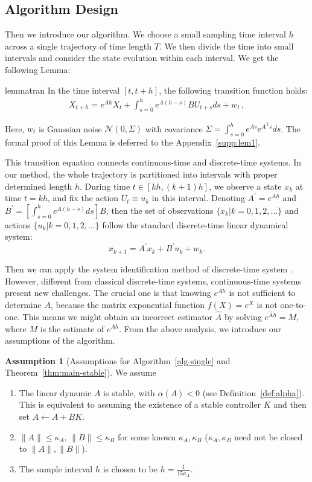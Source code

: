 \documentclass{article}
\theoremstyle{definition}
\newtheorem{assumption}{Assumption}
\begin{document}
\subsection{Algorithm 
Design}\label{section:alg for system id}
Then we introduce our algorithm. We choose a small sampling time interval $h$ across a single trajectory of time length $T$. We then divide the time into small intervals and consider the state evolution within each interval. We get the following Lemma:

\begin{restatable}{lemma}{tran}
\label{lem:tran}
   In the time interval $[t, t+h]$, the following transition function holds:
\begin{align*}
X_{t+h} = e^{Ah}X_{t}+\int_{s=0}^{h}e^{A(h-s)}BU_{t+s}ds+ w_t \,,
\end{align*}
\end{restatable}

Here, $w_{t}$ is Gaussian noise $\mathcal{N}(0, \Sigma)$ with covariance $\Sigma = \int_{s=0}^{h}e^{As}e^{A^{\mathrm{T}}s}ds$. The formal proof of this Lemma is deferred to the Appendix~\ref{supp:lem1}.

This transition equation connects continuous-time and discrete-time systems. In our method, the whole trajectory is partitioned into intervals with proper determined length $h$. During time $t\in[kh,(k+1)h]$, we observe a state $x_{k}$ at time $t=kh$, and fix the action $U_{t}\equiv u_{k}$ in this interval. Denoting $A^{'}=e^{Ah}$ and $B^{'}=\left[\int_{s=0}^{h}e^{A(h-s)}ds\right] B$, then the set of observations $\{x_{k} \vert k=0,1,2,...  \}$ and actions $\{u_{k} \vert k=0,1,2,...  \}$ follow the standard discrete-time linear dynamical system:
$$ x_{k+1}=A^{'}x_{k}+B^{'}u_{k}+w_{k}.$$

Then we can apply the system identification method of discrete-time system~\cite{ref4, ref5}. However, different from classical discrete-time systems, continuous-time systems present new challenges. The crucial one is that knowing $e^{Ah}$ is not sufficient to determine $A$, because the matrix exponential function $f(X)=e^{X}$ is not one-to-one. This means we might obtain an incorrect estimator $\hat{A}$ by solving $e^{\hat{A}h}=M$, where $M$ is the estimate of $e^{Ah}$. From the above analysis, we introduce our assumptions of the algorithm.
\begin{assumption}[Assumptions for Algorithm~\ref{alg-single} and Theorem~\ref{thm:main-stable}]\label{assumption:stable} We assume
    \begin{enumerate}
        \item The linear dynamic $A$ is stable, with $\alpha(A)<0$ (see Definition~\ref{def:alpha}). This is equivalent to assuming the existence of a stable controller $K$ and then set $A \leftarrow A + BK$.
        \item $\|A\|\leq\kappa_{A}$, $\|B\|\leq \kappa_{B}$ for some known $\kappa_{A},\kappa_{B}$ ($\kappa_{A},\kappa_{B}$ need not be closed to $\|A\|,\|B\|$).
        \item The sample interval $h$ is chosen to be $h=\frac{1}{15\kappa_{A}}$.
    \end{enumerate}
\end{assumption}
\end{document}
